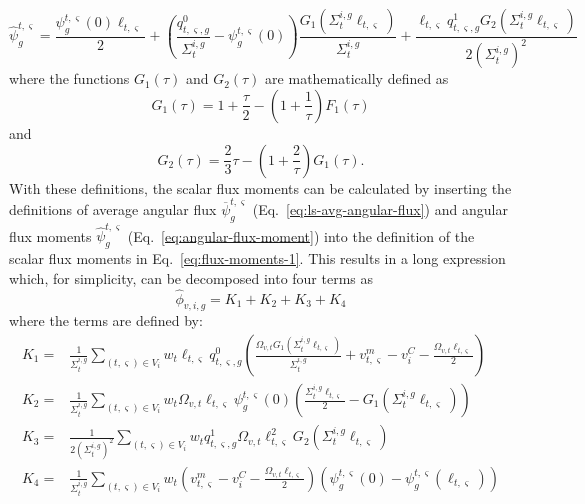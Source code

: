 \begin{equation}
\hat{\psi}^{t,\varsigma}_g = \frac{\psi^{t,\varsigma}_g(0) \ell_{t,\varsigma}}{2} + \left(\frac{q^0_{t,\varsigma,g}}{\Sigma_{t}^{i,g}} - \psi^{t,\varsigma}_g(0) \right) \frac{G_1(\Sigma_{t}^{i,g} \ell_{t,\varsigma})}{\Sigma_{t}^{i,g}} + \frac{\ell_{t,\varsigma} q^1_{t,\varsigma,g} G_2(\Sigma_{t}^{i,g} \ell_{t,\varsigma})}{2\left(\Sigma_{t}^{i,g}\right)^2}
\label{eq:angular-flux-moment}
\end{equation}
where the functions $G_1(\tau)$ and $G_2(\tau)$ are mathematically defined as
\begin{equation}
G_1(\tau) = 1 + \frac{\tau}{2} - \left(1 + \frac{1}{\tau}\right) F_1(\tau)
\end{equation}
and
\begin{equation}
G_2(\tau) = \frac{2}{3} \tau - \left(1 + \frac{2}{\tau}\right) G_1(\tau).
\end{equation}
With these definitions, the scalar flux moments can be calculated by inserting the definitions of average angular flux $\overline{\psi}^{t,\varsigma}_g$ (Eq.~\ref{eq:ls-avg-angular-flux}) and angular flux moments $\hat{\psi}^{t,\varsigma}_g$ (Eq.~\ref{eq:angular-flux-moment})  into the definition of the scalar flux moments in Eq.~\ref{eq:flux-moments-1}. This results in a long expression which, for simplicity, can be decomposed into four terms as
\begin{equation}
\hat{\phi}_{v,i,g} = K_1 + K_2 + K_3 + K_4
\end{equation}
where the terms are defined by:
\begin{align}
K_1 = & \frac{1}{\Sigma_{t}^{i,g}} \sum_{(t,\varsigma) \in V_i} w_t \ell_{t,\varsigma} q^0_{t,\varsigma,g} \left(\frac{\Omega_{v,t} G_1(\Sigma_{t}^{i,g} \ell_{t,\varsigma})}{\Sigma_{t}^{i,g}} +  v^m_{t,\varsigma} - v^C_i - \frac{\Omega_{v,t} \ell_{t,\varsigma}}{2} \right) \\
K_2 = & \frac{1}{\Sigma_{t}^{i,g}} \sum_{(t,\varsigma) \in V_i} w_t \Omega_{v,t} \ell_{t,\varsigma} \psi^{t,\varsigma}_g(0) \left(\frac{\Sigma_{t}^{i,g} \ell_{t,\varsigma}}{2} - G_1(\Sigma_{t}^{i,g} \ell_{t,\varsigma}) \right) \\
K_3 = & \frac{1}{2\left(\Sigma_{t}^{i,g}\right)^2} \sum_{(t,\varsigma) \in V_i} w_t q^1_{t,\varsigma,g} \Omega_{v,t} \ell_{t,\varsigma}^2 G_2(\Sigma_{t}^{i,g} \ell_{t,\varsigma}) \\
K_4 = & \frac{1}{\Sigma_{t}^{i,g}} \sum_{(t,\varsigma) \in V_i} w_t \left( v^m_{t,\varsigma} - v^C_i- \frac{\Omega_{v,t} \ell_{t,\varsigma}}{2} \right) \left(\psi^{t,\varsigma}_g(0) - \psi^{t,\varsigma}_g(\ell_{t,\varsigma}) \right)
\end{align}
